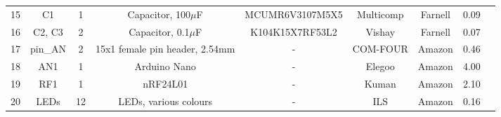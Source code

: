 \begin{table}[!h]
\begin{adjustbox}{angle=90}
\begin{tabular}{|c|c|c|c|c|c|c|c|c|}
		15 & C1 		& 1 	& Capacitor, 100$\mu$F               & MCUMR6V3107M5X5 	& Multicomp 		& Farnell 	& 0.09\\
		16 & C2, C3 	& 2		& Capacitor, 0.1$\mu$F               & K104K15X7RF53L2	& Vishay 			& Farnell 	& 0.07\\
		\hline
		\hline
		17 & pin\_AN 	& 2 	& 15x1 female pin header, 2.54mm & -  				& COM-FOUR 			& Amazon 	& 0.46\\		
		18 & AN1     	& 1 	& Arduino Nano					 & - 				& Elegoo 			& Amazon 	& 4.00\\		
		19 & RF1      	& 1 	& nRF24L01						 & - 				& Kuman 			& Amazon 	& 2.10\\
		20 & LEDs     	& 12 	& LEDs, various colours 		 & - 				& ILS 				& Amazon 	& 0.16\\
		\hline
	\end{tabular}
	\end{adjustbox}
\end{table}